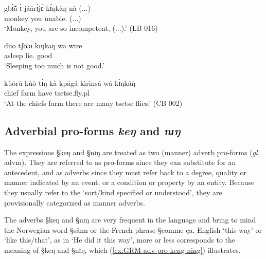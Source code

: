 \begin{exe}
\ex\label{ex:GRM-adj-mann-alot}
\begin{xlist}
\ex\label{ex:GRM-adj-mann-alot-v}
\gll gbɪ̃̀ã́         	ɪ̀     	jáárɪ́jɛ́      	kɪ́ŋkàŋ     	nà
(...)\\ 
monkey 	you   	unable.{\pfv} 	  {\advm} {\foc} (...)\\
\glt `Monkey, you are so incompetent, (...).' (LB 016)

\ex\label{ex:GRM-adj-mann-alot-n}

\gll duo tʃʊɔɪ kɪŋkaŋ wa wire\\
asleep lie.{\nmlz} {\advm} {\neg} good\\
\glt `Sleeping too much is not good.'

\ex\label{ex:GRM-adj-mann-alot-quant}
\gll kùórù 	kùò  	tɪ́ŋ 	kà   kpágá kìrìnsá wá  kɪ̀ŋkáŋ̀\\
 chief farm {\art} {\egr} have tsetse.fly.{\sc pl}   {\foc}  {\quant}\\
\glt 	`At the chiefs farm there are many tsetse flies.' (CB 002)

\end{xlist}
\end{exe}






\subsection{Adverbial pro-forms {\it keŋ} and {\it nɪŋ}}
\label{sec:GRM-adv-pro}

The expressions  {\S keŋ} and {\S nɪŋ} are treated as  two (manner) adverb
pro-forms ({\it gl.} {\sc advm}).  They are referred to as pro-forms since they
can substitute for an antecedent,  and  as  adverbs since they must refer back
to a
degree, quality or manner indicated by an event, or  a condition or property by 
an entity. Because they usually refer to the `sort/kind specified or
understood', they are provisionally categorized as manner adverbs.

The adverbs   {\S keŋ} and {\S nɪŋ} are very frequent in the
language and bring
to mind the Norwegian word {\S sånn} or the French phrase {\S comme \c{c}a}. 
English `this way' or `like this/that', as in `He did it this way',  more
or less corresponds to
the meaning of   {\S keŋ} and {\S nɪŋ}, which (\ref{ex:GRM-adv-pro-keng-ning})
illustrates.



